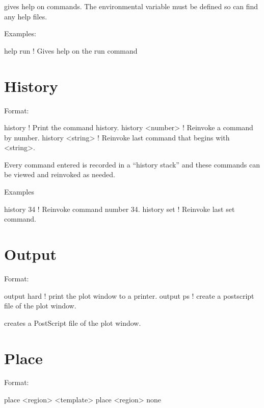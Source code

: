\vskip 0.2in 
 gives help on \tao commands. The environmental
variable  must be defined so \tao can find any help files.

Examples:
\begin{example}
  help run   ! Gives help on the run command
\end{example}

\section{History}
\label{s:history}

Format:
\begin{example}
  history           ! Print the command history.
  history <number>  ! Reinvoke a command by number.
  history <string>  ! Reinvoke last command that begins with <string>.
\end{example}

\vskip 0.2in
Every \tao command entered is recorded in a ``history stack'' and
these commands can be viewed and reinvoked as needed. 

Examples
\begin{example}
  history 34   ! Reinvoke command number 34.
  history set  ! Reinvoke last set command.  
\end{example}

\section{Output}
\label{s:output}

Format:
\begin{example}
  output hard     ! print the plot window to a printer.
  output ps       ! create a postscript file of the plot window.
\end{example}

\vskip 0.2in
 creates a PostScript file of the plot window. 

\section{Place}
\label{s:place}

Format:
\begin{example}
  place <region> <template>
  place <region> none
\end{example}

